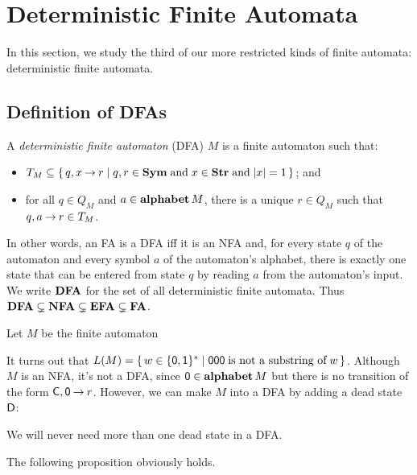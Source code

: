 \section{Deterministic Finite Automata}
\label{DeterministicFiniteAutomata}

%
%
%

In this section, we study the third of our more restricted kinds of
finite automata: deterministic finite automata.

\subsection{Definition of DFAs}

A \emph{deterministic finite automaton} (DFA) $M$ is a finite
automaton such that:
\begin{itemize}
\item $T_M\subseteq\{ \, q,x\mathbin{\to} r \mid q,r\in\mathbf{Sym}\;\allowbreak\mbox{and}\allowbreak\;x\in\mathbf{Str}\;\allowbreak\mbox{and}\allowbreak\;|x|=1 \, \}$;
  and

\item for all $q\in Q_M$ and $a\in\mathbf{alphabet}\,M$, there is a unique $r\in Q_M$
such that $q,a\mathbin{\to} r\in T_M$.
\end{itemize}
In other words, an FA is a DFA iff it is an NFA and, for every state
$q$ of the automaton and every symbol $a$ of the automaton's alphabet,
there is exactly one state that can be entered from state $q$ by
%
%
%
reading $a$ from the automaton's input.  We write $\mathbf{DFA}$ for the set
of all deterministic finite automata.  Thus
$\mathbf{DFA}\subsetneq\mathbf{NFA}\subsetneq\mathbf{EFA}\subsetneq\mathbf{FA}$.

Let $M$ be the finite automaton
\begin{center}

\end{center}
It turns out that $L(M)=
\{ \, w\in\{\mathsf{0,1}\}^* \mid \mathsf{000}\;\allowbreak\mbox{is not a substring
    of}\allowbreak\;w \, \}$.  Although $M$ is an NFA, it's not a DFA, since
$\mathsf{0}\in\mathbf{alphabet}\,M$ but there is no transition of the form
$\mathsf{C},\mathsf{0}\mathbin{\to} r$.  However, we can make $M$ into a DFA by adding a dead
state $\mathsf{D}$:
\begin{center}

\end{center}
We will never need more than one dead state in a DFA.

The following proposition obviously holds.

